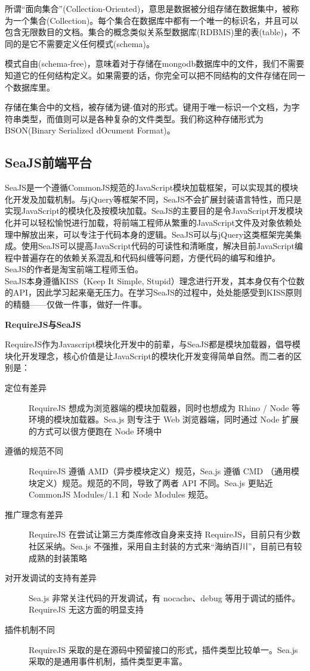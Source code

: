 \indent
所谓“面向集合”(Collection-Oriented)，意思是数据被分组存储在数据集中，被称为一个集合(Collection)。每个集合在数据库中都有一个唯一的标识名，并且可以包含无限数目的文档。集合的概念类似关系型数据库(RDBMS)里的表(table)，不同的是它不需要定义任何模式(schema)。

\indent
模式自由(schema-free)，意味着对于存储在mongodb数据库中的文件，我们不需要知道它的任何结构定义。如果需要的话，你完全可以把不同结构的文件存储在同一个数据库里。

\indent
存储在集合中的文档，被存储为键-值对的形式。键用于唯一标识一个文档，为字符串类型，而值则可以是各种复杂的文件类型。我们称这种存储形式为BSON(Binary Serialized dOcument Format)。

\subsection{SeaJS前端平台}
\indent
SeaJS是一个遵循CommonJS规范的JavaScript模块加载框架，可以实现其的模块化开发及加载机制。与jQuery等框架不同，SeaJS不会扩展封装语言特性，而只是实现JavaScript的模块化及按模块加载。SeaJS的主要目的是令JavaScript开发模块化并可以轻松愉悦进行加载，将前端工程师从繁重的JavaScript文件及对象依赖处理中解放出来，可以专注于代码本身的逻辑。SeaJS可以与jQuery这类框架完美集成。使用SeaJS可以提高JavaScript代码的可读性和清晰度，解决目前JavaScript编程中普遍存在的依赖关系混乱和代码纠缠等问题，方便代码的编写和维护。\\[0.1cm]
\indent
SeaJS的作者是淘宝前端工程师玉伯。\\
\indent
SeaJS本身遵循KISS（Keep It Simple, Stupid）理念进行开发，其本身仅有个位数的API，因此学习起来毫无压力。在学习SeaJS的过程中，处处能感受到KISS原则的精髓——仅做一件事，做好一件事。

\textbf{RequireJS与SeaJS}
\par
RequireJS作为Javascript模块化开发中的前辈，与SeaJS都是模块加载器，倡导模块化开发理念，核心价值是让JavaScript的模块化开发变得简单自然。而二者的区别是：
\begin{description}
  \item[定位有差异] RequireJS 想成为浏览器端的模块加载器，同时也想成为 Rhino / Node 等环境的模块加载器。Sea.js 则专注于 Web 浏览器端，同时通过 Node 扩展的方式可以很方便跑在 Node 环境中
  \item[遵循的规范不同] RequireJS 遵循 AMD（异步模块定义）规范，Sea.js 遵循 CMD （通用模块定义）规范。规范的不同，导致了两者 API 不同。Sea.js 更贴近 CommonJS Modules/1.1 和 Node Modules 规范。
  \item[推广理念有差异] RequireJS 在尝试让第三方类库修改自身来支持 RequireJS，目前只有少数社区采纳。Sea.js 不强推，采用自主封装的方式来“海纳百川”，目前已有较成熟的封装策略
  \item[对开发调试的支持有差异] Sea.js 非常关注代码的开发调试，有 nocache、debug 等用于调试的插件。RequireJS 无这方面的明显支持
  \item[插件机制不同] RequireJS 采取的是在源码中预留接口的形式，插件类型比较单一。Sea.js 采取的是通用事件机制，插件类型更丰富。
\end{description}

\clearpage